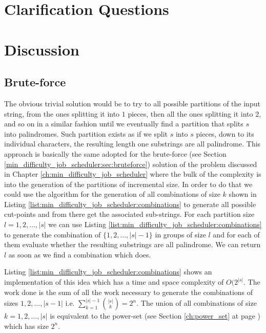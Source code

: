 \section{Clarification Questions}

\begin{QandA}
	\item 
	\begin{answered}
		\textit{}
	\end{answered}
	
\end{QandA}

\section{Discussion}
\label{palindrome_partitioning2:sec:discussion}


\subsection{Brute-force}
\label{palindrome_partitioning2:sec:bruteforce}
The obvious trivial solution would be to try to all possible partitions of the input string, from the ones splitting it into $1$ pieces, then all the ones splitting it into $2$, and so on in a similar fashion
until we eventually find a partition that splits $s$ into palindromes. Such partition exists as if we split $s$ into $s$ pieces, down to its individual characters, the resulting 
length one substrings are all palindrome. This approach is basically the same adopted for the brute-force (see Section \ref{min_difficulty_job_scheduler:sec:bruteforce}) 
solution of the problem discussed in Chapter \ref{ch:min_difficulty_job_scheduler} where the bulk of the complexity
is into the generation of the partitions of incremental size. 
In order to do that we could use the algorithm for the generation of all combinations of size $k$ shown in 
Listing \ref{list:min_difficulty_job_scheduler:combinations} to generate all possible cut-points and from there get the associated sub-strings.
For each partition size $l = 1,2,\ldots,|s|$ we can use Listing \ref{list:min_difficulty_job_scheduler:combinations} to generate the combination of $\{1,2,\ldots,|s|-1\}$
in groups of size $l$ and for each of them evaluate whether the resulting substrings are all palindrome. We can return $l$ as soon as we find a combination which does.

Listing \ref{list:min_difficulty_job_scheduler:combinations} shows an implementation of this idea which has a time and space complexity of $O(2^{|s|}$. 
The work done is the sum of all the work necessary to generate the combinations of sizes $1,2,\ldots,|s-1|$ i.e. $\sum_{k=1}^{|s|-1} {|s| \choose k} = 2^n$.
The union of all combinations of size $k=1,2,\ldots,|s|$ is equivalent to the power-set (see Section \ref{ch:power_set} at page \pageref{sec:powerset:discussion}) which has size $2^n$.

